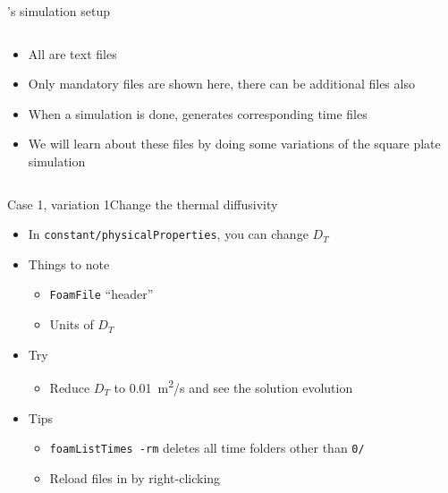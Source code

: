 \begin{frame}{\openfoam's simulation setup}
\begin{columns}
\begin{column}{0.5\linewidth}
\begin{itemize}
                \item All are text files
                \item Only mandatory files are shown here, there can be additional files also
                \item When a simulation is done, \openfoam{} generates corresponding time files
                \item We will learn about these files by doing some variations of the square plate simulation
            \end{itemize}
        \end{column}
    \end{columns}
\end{frame}

\begin{frame}{Case 1, variation 1}{Change the thermal diffusivity}
    \begin{itemize}
        \setitemsep{1em}
        \item In \texttt{constant/physicalProperties}, you can change $D_T$
        \item Things to note
        \begin{itemize}
            \item \texttt{FoamFile} ``header''
            \item Units of $D_T$
        \end{itemize}
        \item Try
        \begin{itemize}
            \item Reduce $D_T$ to \qty{0.01}{m^2/s} and see the solution evolution
        \end{itemize}
        \item Tips
        \begin{itemize}
            \item \texttt{foamListTimes -rm} deletes all time folders other than \texttt{0/}
            \item Reload files in \paraview{} by right-clicking
        \end{itemize}
    \end{itemize}
\end{frame}


